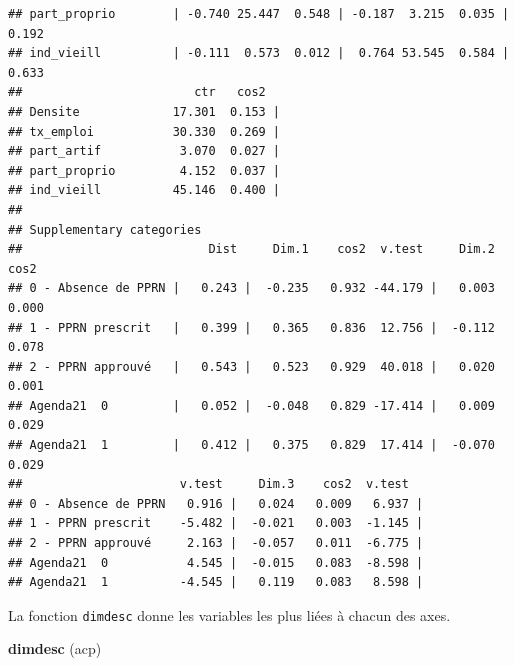 \documentclass[]{book}
\newenvironment{Shaded}{\begin{snugshade}}{\end{snugshade}}
\newcommand{\KeywordTok}[1]{\textcolor[rgb]{0.13,0.29,0.53}{\textbf{#1}}}
\newcommand{\NormalTok}[1]{#1}
\begin{document}
\begin{verbatim}
## part_proprio        | -0.740 25.447  0.548 | -0.187  3.215  0.035 |  0.192
## ind_vieill          | -0.111  0.573  0.012 |  0.764 53.545  0.584 |  0.633
##                        ctr   cos2  
## Densite             17.301  0.153 |
## tx_emploi           30.330  0.269 |
## part_artif           3.070  0.027 |
## part_proprio         4.152  0.037 |
## ind_vieill          45.146  0.400 |
## 
## Supplementary categories
##                          Dist     Dim.1    cos2  v.test     Dim.2    cos2
## 0 - Absence de PPRN |   0.243 |  -0.235   0.932 -44.179 |   0.003   0.000
## 1 - PPRN prescrit   |   0.399 |   0.365   0.836  12.756 |  -0.112   0.078
## 2 - PPRN approuvé   |   0.543 |   0.523   0.929  40.018 |   0.020   0.001
## Agenda21  0         |   0.052 |  -0.048   0.829 -17.414 |   0.009   0.029
## Agenda21  1         |   0.412 |   0.375   0.829  17.414 |  -0.070   0.029
##                      v.test     Dim.3    cos2  v.test  
## 0 - Absence de PPRN   0.916 |   0.024   0.009   6.937 |
## 1 - PPRN prescrit    -5.482 |  -0.021   0.003  -1.145 |
## 2 - PPRN approuvé     2.163 |  -0.057   0.011  -6.775 |
## Agenda21  0           4.545 |  -0.015   0.083  -8.598 |
## Agenda21  1          -4.545 |   0.119   0.083   8.598 |
\end{verbatim}

La fonction \texttt{dimdesc} donne les variables les plus liées à chacun des axes.

\begin{Shaded}
\begin{Highlighting}[]
\KeywordTok{dimdesc}\NormalTok{ (acp)}
\end{Highlighting}
\end{Shaded}
\end{document}
